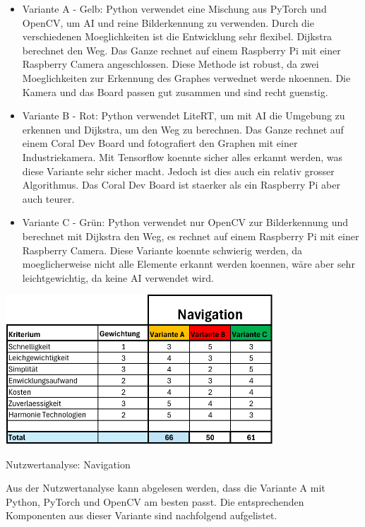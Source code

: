 \begin{itemize}
     \item Variante A - Gelb: Python verwendet eine Mischung aus PyTorch und OpenCV, um AI und reine Bilderkennung zu verwenden. Durch die verschiedenen Moeglichkeiten ist die Entwicklung sehr flexibel. Dijkstra berechnet den Weg. Das Ganze rechnet auf einem Raspberry Pi mit einer Raspberry Camera angeschlossen. Diese Methode ist robust, da zwei Moeglichkeiten zur Erkennung des Graphes verwednet werde nkoennen. Die Kamera und das Board passen gut zusammen und sind recht guenstig. 
    \item  Variante B - Rot: Python verwendet LiteRT, um mit AI die Umgebung zu erkennen und Dijkstra, um den Weg zu berechnen. Das Ganze rechnet auf einem Coral Dev Board und fotografiert den Graphen mit einer Industriekamera. Mit Tensorflow koennte sicher alles erkannt werden, was diese Variante sehr sicher macht. Jedoch ist dies auch ein relativ grosser Algorithmus. Das Coral Dev Board ist staerker als ein Raspberry Pi aber auch teurer.
    \item Variante C - Grün: Python verwendet nur OpenCV zur Bilderkennung und berechnet mit Dijkstra den Weg, es rechnet auf einem Raspberry Pi mit einer Raspberry Camera. Diese Variante koennte schwierig werden, da moeglicherweise nicht alle Elemente erkannt werden koennen, wäre aber sehr leichtgewichtig, da keine AI verwendet wird.
\end{itemize}


\begin{table}[H]
\centering
\includegraphics[width=0.75\textwidth]{assets/Nutzwertanalyse-I.pdf}
\caption{Nutzwertanalyse: Navigation}
\label{table:nutzwert-informatik}
\end{table}

Aus der Nutzwertanalyse kann abgelesen werden, dass die Variante A mit Python, PyTorch und OpenCV am besten passt. Die entsprechenden Komponenten aus dieser Variante sind nachfolgend aufgelistet.

